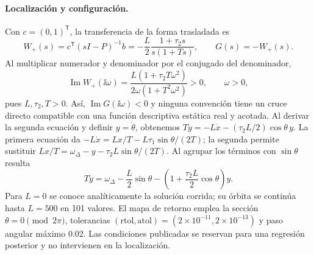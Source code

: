 \paragraph{Localización y configuración.}
Con \(c=(0,1)^{\mathsf T}\), la transferencia de la forma trasladada es
\begin{equation}
 W_+(s)=c^{\mathsf T}(sI-P)^{-1}b
 =-\frac{L}{2}\frac{1+\tau_2s}{s(1+Ts)},\qquad G(s)=-W_+(s).
 \label{ncbench:eq:pll-transfer}
\end{equation}
Al multiplicar numerador y denominador por el conjugado del denominador,
\[
 \operatorname{Im}W_+(\ii\omega)
 =\frac{L(1+\tau_2T\omega^2)}{2\omega(1+T^2\omega^2)}>0,
 \qquad \omega>0,
\]
pues \(L,\tau_2,T>0\). Así, \(\operatorname{Im}G(\ii\omega)<0\) y ninguna
convención tiene un cruce directo compatible con una función
descriptiva estática real y acotada. Al derivar la segunda ecuación y definir
\(y=\dot\theta\), obtenemos
\(T\dot y=-L\dot x-(\tau_2L/2)\cos\theta\,y\).
La primera ecuación da
\(-L\dot x=Lx/T-L\tau_1\sin\theta/(2T)\); la segunda permite
sustituir \(Lx/T=\omega_\Delta-y-\tau_2L\sin\theta/(2T)\).
Al agrupar los términos con \(\sin\theta\) resulta
\begin{equation}
 T\dot y=\omega_\Delta-\frac{L}{2}\sin\theta
 -\left(1+\frac{\tau_2L}{2}\cos\theta\right)y.
 \label{ncbench:eq:pll-andronov}
\end{equation}
Para \(L=0\) se conoce analíticamente la solución corrida; su órbita se
continúa hasta \(L=500\) en 101 valores. El mapa de retorno emplea la sección
\(\theta=0\pmod{2\pi}\), tolerancias
\((\mathrm{rtol},\mathrm{atol})=(2\times10^{-11},2\times10^{-13})\) y paso
angular máximo \(0.02\). Las condiciones publicadas se reservan para una
regresión posterior y no intervienen en la localización.

